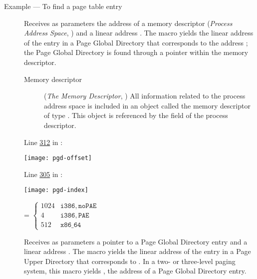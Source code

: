 \begin{frame}{Example --- To find a page table entry}{}
  \begin{center}
     
  \end{center}
\end{frame}

\begin{description}
\item[] Receives as parameters the address of a memory
  descriptor  (\emph{Process Address Space},
  \cite[Chapter 9]{bovet2005understanding}) and a linear address . The macro yields the
  linear address of the entry in a Page Global Directory that corresponds to the address
  ; the Page Global Directory is found through a pointer within the memory
  descriptor.
  \begin{description}
  \item[Memory descriptor] (\emph{The Memory Descriptor},
    \cite[Sec 9.2]{bovet2005understanding}) All information related to the process address space is
    included in an object called the memory descriptor of type . This
    object is referenced by the  field of the process descriptor.
  \end{description}

  Line \href{http://lxr.linux.no/linux+v2.6.11/include/asm-i386/pgtable.h#L312}{312} in
  :
  \begin{center}
    \texttt{[image: pgd-offset]}
  \end{center}

  Line \href{http://lxr.linux.no/linux+v2.6.11/include/asm-i386/pgtable.h#L305}{305} in 
  :
  \begin{center}
    \texttt{[image: pgd-index]}
  \end{center}

   = $ \begin{cases}
    1024&\mathtt{i386, noPAE}\\
    4&\mathtt{i386, PAE}\\
    512&\mathtt{x86\_64}
  \end{cases}$

\item[] Receives as parameters a pointer  to a Page
  Global Directory entry and a linear address . The macro yields the linear
  address of the entry in a Page Upper Directory that corresponds to . In a
  two- or three-level paging system, this macro yields , the address of a Page
  Global Directory entry.


\end{description}
